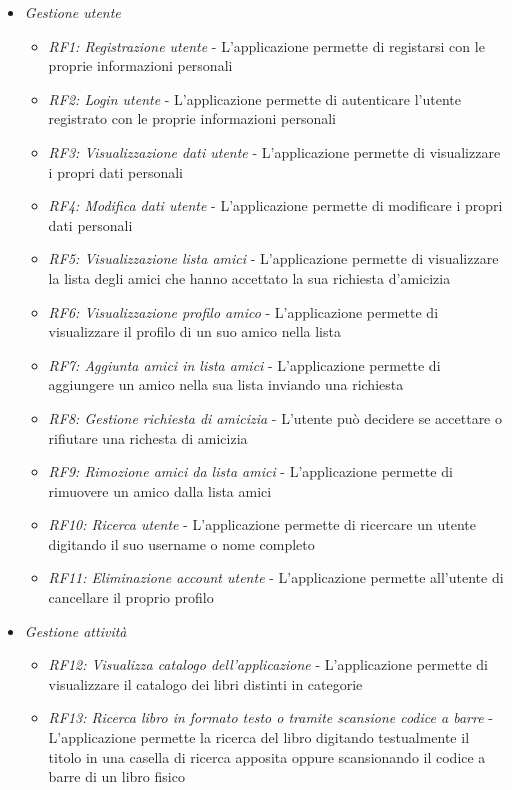 \documentclass{article}
\begin{document}
\begin{itemize}
    \item \textit{Gestione utente}
    \begin{itemize}
        \item \textit{RF1: Registrazione utente} - L'applicazione permette di registarsi con le proprie informazioni personali
        \item \textit{RF2: Login utente} - L'applicazione permette di autenticare l'utente registrato con le proprie informazioni personali
        \item \textit{RF3: Visualizzazione dati utente} - L'applicazione permette di visualizzare i propri dati personali
        \item \textit{RF4: Modifica dati utente} - L'applicazione permette di modificare i propri dati personali
        \item \textit{RF5: Visualizzazione lista amici} - L'applicazione permette di visualizzare la lista degli amici che hanno accettato la sua richiesta d'amicizia
        \item \textit{RF6: Visualizzazione profilo amico} - L'applicazione permette di visualizzare il profilo di un suo amico nella lista
        \item \textit{RF7: Aggiunta amici in lista amici} - L'applicazione permette di aggiungere un amico nella sua lista inviando una richiesta
        \item \textit{RF8: Gestione richiesta di amicizia} - L'utente può decidere se accettare o rifiutare una richesta di amicizia
        \item \textit{RF9: Rimozione amici da lista amici} - L'applicazione permette di rimuovere un amico dalla lista amici
        \item \textit{RF10: Ricerca utente} - L'applicazione permette di ricercare un utente digitando il suo username o nome completo
        \item \textit{RF11: Eliminazione account utente} - L'applicazione permette all'utente di cancellare il proprio profilo
    \end{itemize}
    \item \textit{Gestione attività}
    \begin{itemize}
        \item \textit{RF12: Visualizza catalogo dell'applicazione} - L'applicazione permette di visualizzare il catalogo dei libri distinti in categorie
        \item \textit{RF13: Ricerca libro in formato testo o tramite scansione codice a barre} - L'applicazione permette la ricerca del libro digitando testualmente il titolo in una casella di ricerca apposita oppure scansionando il codice a barre di un libro fisico

\end{itemize}
\end{itemize}
\end{document}
